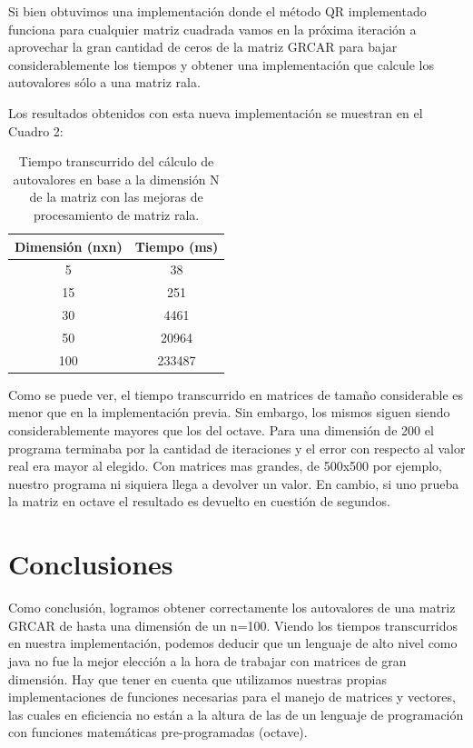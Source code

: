 \documentclass[a4paper,10pt,spanish]{article}
\begin{document}
Si bien obtuvimos una implementación donde el método QR implementado funciona para cualquier matriz cuadrada vamos en la próxima iteración a aprovechar la gran cantidad de ceros de la matriz GRCAR para bajar considerablemente los tiempos y obtener una implementación que calcule los autovalores sólo a una matriz rala.

Los resultados obtenidos con esta nueva implementación se muestran en el Cuadro 2:

\begin{center}
\begin{table}[!htbp]
\centering
\begin{tabular}{cc}
\hline
\textbf{Dimensión (nxn)} & \textbf{Tiempo (ms)} \\ \hline
5                  & 38                \\
15                 & 251                \\
30                 & 4461                 \\
50                 & 20964                \\
100                & 233487
\end{tabular}
\caption[Texto del índice (opcional)]{Tiempo transcurrido del cálculo de autovalores en base a la dimensión N de la matriz con las mejoras de procesamiento de matriz rala.}
\end{table}
\end{center}


Como se puede ver, el tiempo transcurrido en matrices de tamaño considerable es menor que en la implementación previa. Sin embargo, los mismos siguen siendo considerablemente mayores que los del octave. Para una dimensión de 200 el programa terminaba por la cantidad de iteraciones y el error con respecto al valor real era mayor al elegido. Con matrices mas grandes, de 500x500 por ejemplo, nuestro programa ni siquiera llega a devolver un valor. En cambio, si uno prueba la matriz en octave el resultado es devuelto en cuestión de segundos.


\section{Conclusiones}
Como conclusión, logramos obtener correctamente los autovalores de una matriz GRCAR de hasta una dimensión de un n=100. Viendo los tiempos transcurridos en nuestra implementación, podemos deducir que un lenguaje de alto nivel como java no fue la mejor elección a la hora de trabajar con matrices de gran dimensión. Hay que tener en cuenta que utilizamos nuestras propias implementaciones de funciones necesarias para el manejo de matrices y vectores, las cuales en eficiencia no están a la altura de las de un lenguaje de programación con funciones matemáticas pre-programadas (octave).
\end{document}
